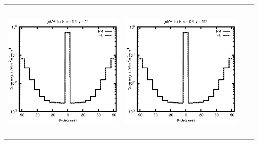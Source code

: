 \begin{tabular}{c c c c}
\includegraphics[height=7cm]{../eps/jok04_Lu_ir_fwd.eps} &
\includegraphics[height=7cm]{../eps/jok04_Lu_ir_cross.eps} \\
\end{tabular}

\pagebreak

